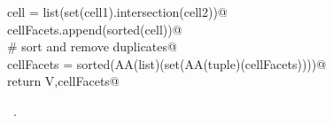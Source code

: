 \documentclass[11pt,oneside]{article}	%
\begin{document}
\begin{flushleft}
\begin{minipage}{\linewidth}
\begin{list}{}{}
\mbox{}\verb@                cell = list(set(cell1).intersection(cell2))@\\
\mbox{}\verb@                cellFacets.append(sorted(cell))@\\
\mbox{}\verb@    # sort and remove duplicates@\\
\mbox{}\verb@    cellFacets = sorted(AA(list)(set(AA(tuple)(cellFacets))))@\\
\mbox{}\verb@    return V,cellFacets@\\
\mbox{}\verb@@{\NWsep}
\end{list}
\vspace{-1ex}
\footnotesize\addtolength{\baselineskip}{-1ex}
\begin{list}{}{\setlength{\itemsep}{-\parsep}\setlength{\itemindent}{-\leftmargin}}
\item \NWtxtMacroRefIn\ .
\end{list}
\end{minipage}\\[4ex]
\end{flushleft}
\end{document}

